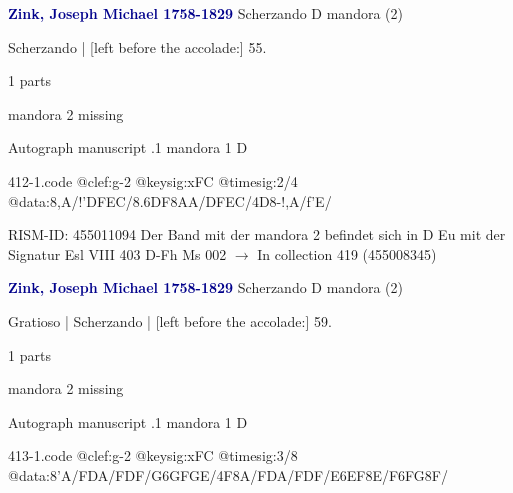 \documentclass[twocolumn]{book}
\begin{document}
\newline \par \vspace{7pt} \textcolor{darkblue}{\textbf{Zink, Joseph Michael  1758-1829}}
\newline Scherzando  D  
\newline mandora (2)
\newline \begin{itshape}[f.29r, at left:] Scherzando | [left before the accolade:] 55.\end{itshape} 
\newline \textcolor{darkblue}{}  1 parts  
\newline \begin{small} mandora 2 missing\end{small} 
\newline Autograph manuscript
.1  mandora 1  D  
\begin{filecontents*}{412-1.code}
@clef:g-2
@keysig:xFC
@timesig:2/4
@data:8,A/!'DFEC/{8.6DF}8AA/DFEC/4D8-!,A/f'E/
\end{filecontents*}
\newline
%

\newline RISM-ID: 455011094
\newline Der Band mit der mandora 2 befindet sich in D Eu mit der Signatur Esl VIII 403
\newline D-Fh  Ms 002
\newline $\rightarrow$ In collection 419 (455008345)

\newline \par \vspace{7pt} \textcolor{darkblue}{\textbf{Zink, Joseph Michael  1758-1829}}
\newline Scherzando  D  
\newline mandora (2)
\newline \begin{itshape}[f.31r, at left:] Gratioso | Scherzando | [left before the accolade:] 59.\end{itshape} 
\newline \textcolor{darkblue}{}  1 parts  
\newline \begin{small} mandora 2 missing\end{small} 
\newline Autograph manuscript
.1  mandora 1  D  
\begin{filecontents*}{413-1.code}
@clef:g-2
@keysig:xFC
@timesig:3/8
@data:8'A/FDA/FDF/{G6GFGE}/4F8A/FDA/FDF/{E6EF8E}/{F6FG8F}/
\end{filecontents*}
\newline
%
\end{document}
